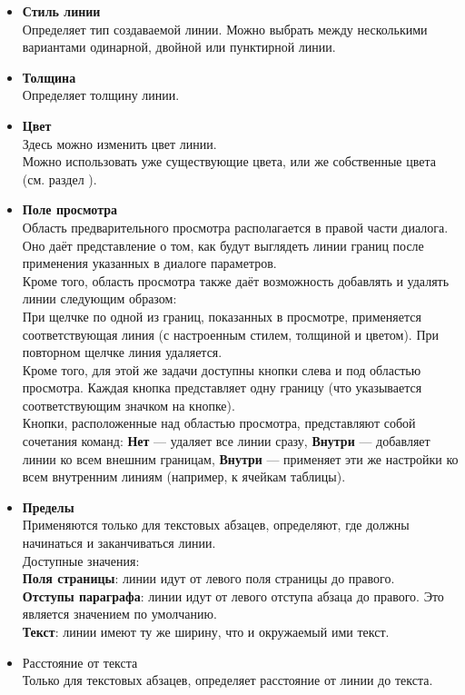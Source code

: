 ﻿\documentclass[a4paper,10pt]{article}
\begin{document}
\begin{itemize}
 \item \textbf{Стиль линии}\\
 Определяет тип создаваемой линии. Можно выбрать между несколькими вариантами одинарной, двойной или пунктирной линии.
 \item \textbf{Толщина}\\
 Определяет толщину линии.
 \item \textbf{Цвет}\\
 Здесь можно изменить цвет линии.\\
 Можно использовать уже существующие цвета, или же собственные цвета (см. раздел ).
 \item \textbf{Поле просмотра}\\
 Область предварительного просмотра располагается в правой части диалога. Оно даёт представление о том, как будут выглядеть линии границ после применения указанных в диалоге параметров.\\
 Кроме того, область просмотра также даёт возможность добавлять и удалять линии следующим образом:\\
 При щелчке по одной из границ, показанных в просмотре, применяется соответствующая линия (с настроенным стилем, толщиной и цветом). При повторном щелчке линия удаляется.\\
 Кроме того, для этой же задачи доступны кнопки слева и под областью просмотра. Каждая кнопка представляет одну границу (что указывается соответствующим значком на кнопке).\\
 Кнопки, расположенные над областью просмотра, представляют собой сочетания команд: \textbf{Нет} — удаляет все линии сразу, \textbf{Внутри} — добавляет линии ко всем внешним границам, \textbf{Внутри} — применяет эти же настройки ко всем внутренним линиям (например, к ячейкам таблицы).
 \item \textbf{Пределы}\\
 Применяются только для текстовых абзацев, определяют, где должны начинаться и заканчиваться линии.\\
 Доступные значения:\\
 \textbf{Поля страницы}: линии идут от левого поля страницы до правого.\\
 \textbf{Отступы параграфа}: линии идут от левого отступа абзаца до правого. Это является значением по умолчанию.\\
 \textbf{Текст}: линии имеют ту же ширину, что и окружаемый ими текст.
 \item Расстояние от текста\\
 Только для текстовых абзацев, определяет расстояние от линии до текста.
\end{itemize}
\end{document}
